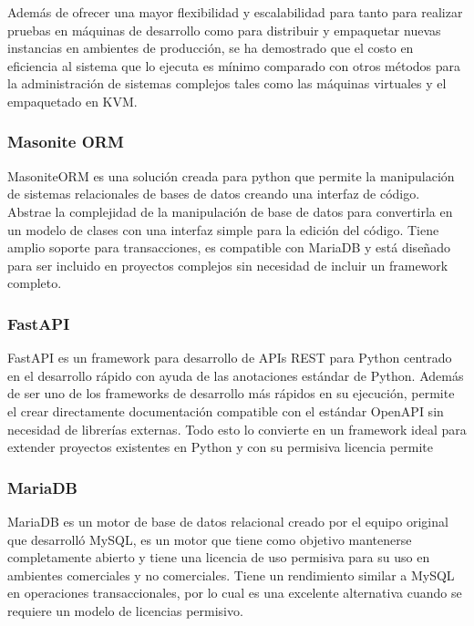 Además de ofrecer una mayor flexibilidad y escalabilidad para tanto para realizar pruebas en máquinas de desarrollo como para distribuir y empaquetar nuevas instancias en ambientes de producción, se ha demostrado que el costo en eficiencia al sistema que lo ejecuta es mínimo comparado con otros métodos para la administración de sistemas complejos tales como las máquinas virtuales y el empaquetado en KVM\cite{rad2017dockerAnalysis, felter2015comparsionPerformance}.

\subsubsection{Masonite ORM}

MasoniteORM es una solución creada para python que permite la manipulación de sistemas relacionales de bases de datos creando una interfaz de código. Abstrae la complejidad de la manipulación de base de datos para convertirla en un modelo de clases con una interfaz simple para la edición del código. Tiene amplio soporte para transacciones, es compatible con MariaDB y está diseñado para ser incluido en proyectos complejos sin necesidad de incluir un framework completo\cite{masonite_2021}.

\subsubsection{FastAPI}

FastAPI es un framework para desarrollo de APIs REST para Python centrado en el desarrollo rápido con ayuda de las anotaciones estándar de Python. Además de ser uno de los frameworks de desarrollo más rápidos en su ejecución, permite el crear directamente documentación compatible con el estándar OpenAPI sin necesidad de librerías externas\cite{fastapi_ramirez_2020}. Todo esto lo convierte en un framework ideal para extender proyectos existentes en Python y con su permisiva licencia permite %


\subsubsection{MariaDB}

MariaDB es un motor de base de datos relacional creado por el equipo original que desarrolló MySQL, es un motor que tiene como objetivo mantenerse completamente abierto y tiene una licencia de uso permisiva para su uso en ambientes comerciales y no comerciales\cite{mariadb_foundation_2019}. Tiene un rendimiento similar a MySQL en operaciones transaccionales, por lo cual es una excelente alternativa cuando se requiere un modelo de licencias permisivo\cite{mariadb_comparison}.


